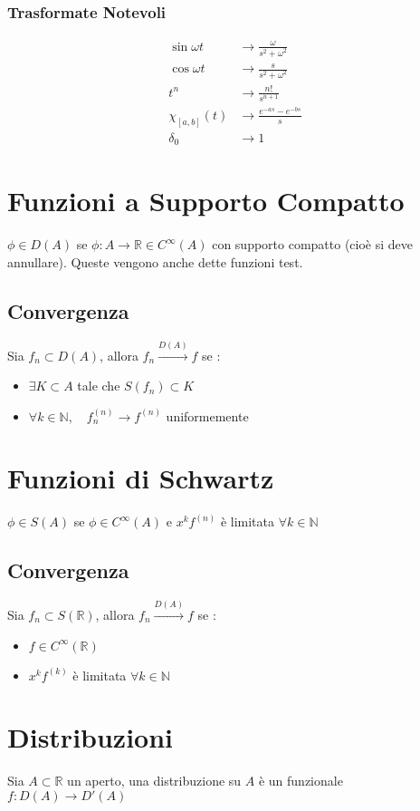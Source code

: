 \documentclass[a4paper,notitlepage]{report}%
\newcommand{\N}{\mathbb{N}}%
\newcommand{\R}{\mathbb{R}}%
\begin{document}
\begin{multicols*}{2}
\subsubsection*{Trasformate Notevoli}
\begin{align*}
    \sin{\omega t} &\rightarrow \frac{\omega}{s^2+\omega^2}\\
    \cos{\omega t} &\rightarrow \frac{s}{s^2+\omega^2}\\
    t^n &\rightarrow \frac{n!}{s^{n+1}}\\
    \chi_[a,b](t) &\rightarrow \frac{e^{-as}-e^{-bs}}{s}\\
    \delta_0 &\rightarrow 1
\end{align*}


\section*{Funzioni a Supporto Compatto}
$\phi\in D(A)$ se $\phi:A\to\R \in C^\infty(A)$ con supporto compatto (cioè si deve annullare).
Queste vengono anche dette funzioni test. 
\subsection*{Convergenza}
Sia $f_n\subset D(A)$, allora $f_n\xrightarrow{D(A)}f$ se :
\begin{itemize}
    \item $\exists K\subset A $ tale che $S(f_n)\subset K$
    \item $\forall k\in\N , \quad f_n^{(n)}\to f^{(n)}$ uniformemente
\end{itemize}
\section*{Funzioni di Schwartz}
$\phi\in S(A)$ se $\phi\in C^\infty(A)$ e $x^kf^{(n)}$ è limitata $\forall k\in \N$
\subsection*{Convergenza}
Sia $f_n\subset S(\R)$, allora $f_n\xrightarrow{D(A)}f$ se :
\begin{itemize}
    \item $f\in C^\infty(\R)$
    \item $x^kf^{(k)}$ è limitata $\forall k\in\N$
\end{itemize}
\section*{Distribuzioni}
Sia $A\subset\R$ un aperto, una distribuzione su $A$ è un funzionale $f:D(A)\to D'(A)$

\end{multicols*}
\end{document}
